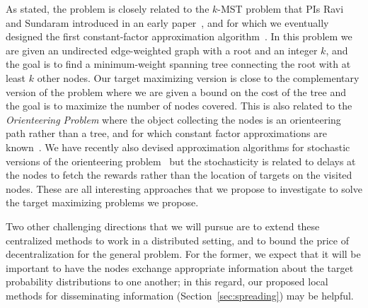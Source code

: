 As stated, the problem is closely related to the $k$-MST problem that
PIs Ravi and Sundaram introduced in an early paper~\cite{RSMRR94}, and
for which we eventually designed the first constant-factor
approximation algorithm~\cite{BRV99}. In this problem we are given an
undirected edge-weighted graph with a root and an integer $k$, and the
goal is to find a minimum-weight spanning tree connecting the root
with at least $k$ other nodes. Our target maximizing version is close
to the complementary version of the problem where we are given a bound
on the cost of the tree and the goal is to maximize the number of
nodes covered. This is also related to the {\em Orienteering Problem}
where the object collecting the nodes is an orienteering path rather
than a tree, and for which constant factor approximations are
known~\cite{BCKLMM03}. We have recently also devised approximation
algorithms for stochastic versions of the orienteering
problem~\cite{GKNR12} but the stochasticity is related to delays at
the nodes to fetch the rewards rather than the location of targets on
the visited nodes. These are all interesting approaches that we
propose to investigate to solve the target maximizing problems we
propose. 

Two other challenging directions that we will pursue are to extend
these centralized methods to work in a distributed setting, and to
bound the price of decentralization for the general problem.  For the
former, we expect that it will be important to have the nodes exchange
appropriate information about the target probability distributions to
one another; in this regard, our proposed local methods for
disseminating information (Section~\ref{sec:spreading}) may be
helpful.

\iffalse
RELATED WORK: karger-minkoff maybecast tree, gupta-nagarajan-ravi
paper on adaptive TSP (icalp 10), and on stochastic vrp (OR, 2012) and
refs in this for previous papers on TSP with independent demands on
nodes (Bertsimas cycle heuristic). Also the basic expected target max
is like orienteering with size bound on tree, and hence related to
k-MST. Also related to garg-gupta-leonardi-sankowsi (SODA 08) which
relates to Univ TSP.
\fi

